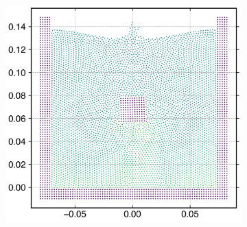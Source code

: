 \begin{figure}[!htpb]
\begin{subfigure}{0.48\textwidth}
    \includegraphics[width=1.0\textwidth]{figures/rfc/figures/qiu_2017_falling_solid_in_water_2d/dx_0_002/time1}
  \end{subfigure}


\end{figure}
